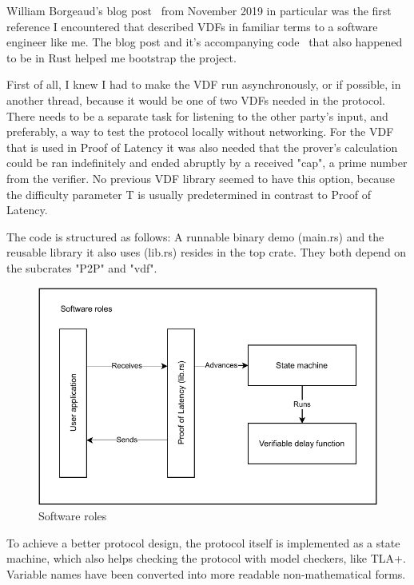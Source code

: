 William Borgeaud's blog post~\cite{Borgeaud2019-wk} from November 2019 in particular was the first reference I encountered that described VDFs in familiar terms to a software engineer like me. The blog post and it's accompanying code~\cite{Borgeaud2019-wk} that also happened to be in Rust helped me bootstrap the project.

First of all, I knew I had to make the VDF run asynchronously, or if possible, in another thread, because it would be one of two VDFs needed in the protocol. There needs to be a separate task for listening to the other party's input, and preferably, a way to test the protocol locally without networking. For the VDF that is used in Proof of Latency it was also needed that the prover's calculation could be ran indefinitely and ended abruptly by a received "cap", a prime number from the verifier. No previous VDF library seemed to have this option, because the difficulty parameter T is usually predetermined in contrast to Proof of Latency.

The code is structured as follows: A runnable binary demo (main.rs) and the reusable library it also uses (lib.rs) resides in the top crate. They both depend on the subcrates "P2P" and "vdf".

\begin{figure}
	\includegraphics[width=\textwidth]{pictures/PoL_software_roles.pdf}
	\caption{Software roles}
	\label{software_roles}
\end{figure}

To achieve a better protocol design, the protocol itself is implemented as a state machine, which also helps checking the protocol with model checkers, like TLA+. Variable names have been converted into more readable non-mathematical forms.

